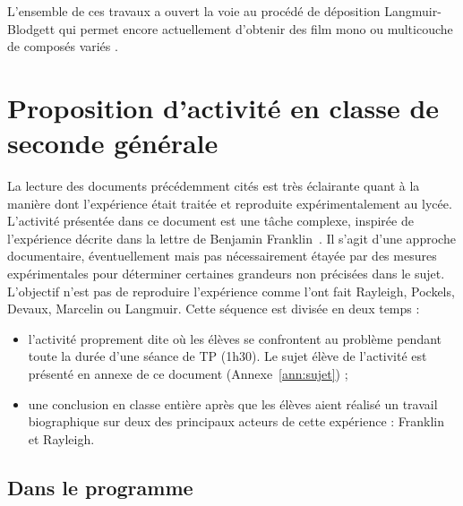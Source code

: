 \documentclass[12pt,a4paper]{article}
\begin{document}
L'ensemble de ces travaux a ouvert la voie au procédé de déposition Langmuir-Blodgett  qui permet encore actuellement d'obtenir des film mono ou multicouche de composés variés \cite{BiolinScientific2011}.

\section{Proposition d'activité en classe de seconde générale}

La lecture des documents précédemment cités est très éclairante quant à la manière dont l'expérience était traitée et reproduite expérimentalement au lycée.
L'activité présentée dans ce document est une tâche complexe, inspirée de l'expérience décrite dans la lettre de Benjamin Franklin~\cite{Franklin1773a}.
Il s'agit d'une approche documentaire, éventuellement mais pas nécessairement étayée par des mesures expérimentales pour déterminer certaines grandeurs non précisées dans le sujet.
L'objectif n'est pas de reproduire l'expérience comme l'ont fait Rayleigh, Pockels, Devaux, Marcelin ou Langmuir.
Cette séquence est divisée en deux temps :
\begin{itemize}
\item l'activité proprement dite où les élèves se confrontent au problème pendant toute la durée d'une séance de TP (1h30).
Le sujet élève de l'activité est présenté en annexe de ce document (Annexe~\ref{ann:sujet}) ;
\item une conclusion en classe entière après que les élèves aient réalisé un travail biographique sur deux des principaux acteurs de cette expérience : Franklin et Rayleigh.
\end{itemize}

\subsection{Dans le programme}
\end{document}

